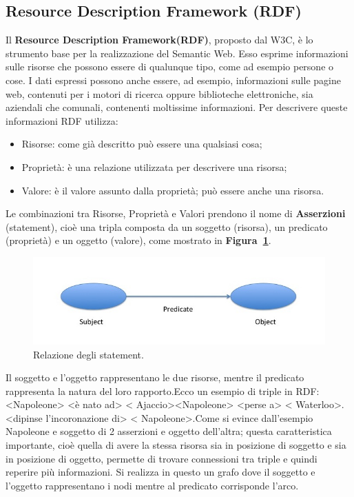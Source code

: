 \documentclass[a4paper,11pt]{article}
\begin{document}
\subsection{Resource Description Framework (RDF)}
\label{sec:2.1}
Il \textbf{Resource Description Framework(RDF)}, proposto dal W3C, è lo strumento base per la realizzazione del Semantic Web. Esso esprime informazioni sulle risorse che possono essere di qualunque tipo, come ad esempio persone o cose.\newline
I dati espressi possono anche essere, ad esempio, informazioni sulle pagine web, contenuti per i motori di ricerca oppure biblioteche elettroniche, sia aziendali che comunali, contenenti moltissime informazioni.
Per descrivere queste informazioni RDF utilizza:
\begin{itemize}
	\item Risorse: come già descritto può essere una qualsiasi cosa;
	\item Proprietà: è una relazione utilizzata per descrivere una risorsa;
	\item Valore: è il valore assunto dalla proprietà; può essere anche una risorsa.
\end{itemize}
Le combinazioni tra Risorse, Proprietà e Valori prendono il nome di \textbf{Asserzioni} (statement), cioè una tripla composta da un soggetto (risorsa), un predicato (proprietà) e un oggetto (valore), come mostrato in \textbf{Figura~\ref{fig:2}}.

\begin{figure}[htbp]
	\centering
	\includegraphics[scale=0.5]{Assertion.jpg}
	\caption{Relazione degli statement.}
	\label{fig:2}
\end{figure}\newpage 

Il soggetto e l'oggetto rappresentano le due risorse, mentre il predicato rappresenta la natura del loro rapporto.\newline Ecco un esempio di triple in RDF:\newline <Napoleone> <è nato ad> < Ajaccio>\newline <Napoleone> <perse a> < Waterloo>. <dipinse l'incoronazione di> < Napoleone>.\newline Come si evince dall'esempio Napoleone e soggetto di 2 asserzioni e oggetto dell'altra; questa caratteristica importante, cioè quella di avere la stessa risorsa sia in posizione di soggetto e sia in posizione di oggetto, permette di trovare connessioni tra triple e quindi reperire più informazioni.
Si realizza in questo un grafo dove il soggetto e l'oggetto rappresentano i nodi mentre al predicato corrisponde l'arco.
\end{document}
